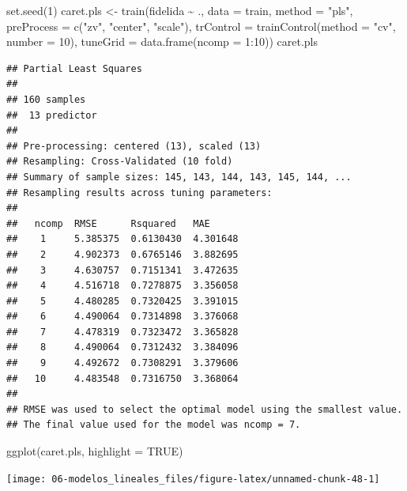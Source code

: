 \documentclass[
  spanish,
]{book}
\newenvironment{Shaded}{\begin{snugshade}}{\end{snugshade}}
\newcommand{\AttributeTok}[1]{\textcolor[rgb]{0.77,0.63,0.00}{#1}}
\newcommand{\ConstantTok}[1]{\textcolor[rgb]{0.00,0.00,0.00}{#1}}
\newcommand{\DecValTok}[1]{\textcolor[rgb]{0.00,0.00,0.81}{#1}}
\newcommand{\FunctionTok}[1]{\textcolor[rgb]{0.00,0.00,0.00}{#1}}
\newcommand{\NormalTok}[1]{#1}
\newcommand{\OtherTok}[1]{\textcolor[rgb]{0.56,0.35,0.01}{#1}}
\newcommand{\SpecialCharTok}[1]{\textcolor[rgb]{0.00,0.00,0.00}{#1}}
\newcommand{\StringTok}[1]{\textcolor[rgb]{0.31,0.60,0.02}{#1}}
\theoremstyle{break}
\theoremstyle{definition}
\theoremstyle{definition}
\theoremstyle{definition}
\theoremstyle{definition}
\theoremstyle{remark}
\begin{document}
\begin{Shaded}
\begin{Highlighting}[]
\FunctionTok{set.seed}\NormalTok{(}\DecValTok{1}\NormalTok{)}
\NormalTok{caret.pls }\OtherTok{\textless{}{-}} \FunctionTok{train}\NormalTok{(fidelida }\SpecialCharTok{\textasciitilde{}}\NormalTok{ ., }\AttributeTok{data =}\NormalTok{ train, }\AttributeTok{method =} \StringTok{"pls"}\NormalTok{,}
                   \AttributeTok{preProcess =} \FunctionTok{c}\NormalTok{(}\StringTok{"zv"}\NormalTok{, }\StringTok{"center"}\NormalTok{, }\StringTok{"scale"}\NormalTok{),}
                   \AttributeTok{trControl =} \FunctionTok{trainControl}\NormalTok{(}\AttributeTok{method =} \StringTok{"cv"}\NormalTok{, }\AttributeTok{number =} \DecValTok{10}\NormalTok{),}
                   \AttributeTok{tuneGrid =} \FunctionTok{data.frame}\NormalTok{(}\AttributeTok{ncomp =} \DecValTok{1}\SpecialCharTok{:}\DecValTok{10}\NormalTok{))}
\NormalTok{caret.pls}
\end{Highlighting}
\end{Shaded}

\begin{verbatim}
## Partial Least Squares 
## 
## 160 samples
##  13 predictor
## 
## Pre-processing: centered (13), scaled (13) 
## Resampling: Cross-Validated (10 fold) 
## Summary of sample sizes: 145, 143, 144, 143, 145, 144, ... 
## Resampling results across tuning parameters:
## 
##   ncomp  RMSE      Rsquared   MAE     
##    1     5.385375  0.6130430  4.301648
##    2     4.902373  0.6765146  3.882695
##    3     4.630757  0.7151341  3.472635
##    4     4.516718  0.7278875  3.356058
##    5     4.480285  0.7320425  3.391015
##    6     4.490064  0.7314898  3.376068
##    7     4.478319  0.7323472  3.365828
##    8     4.490064  0.7312432  3.384096
##    9     4.492672  0.7308291  3.379606
##   10     4.483548  0.7316750  3.368064
## 
## RMSE was used to select the optimal model using the smallest value.
## The final value used for the model was ncomp = 7.
\end{verbatim}

\begin{Shaded}
\begin{Highlighting}[]
\FunctionTok{ggplot}\NormalTok{(caret.pls, }\AttributeTok{highlight =} \ConstantTok{TRUE}\NormalTok{)}
\end{Highlighting}
\end{Shaded}

\begin{center}\texttt{[image: 06-modelos\_lineales\_files/figure-latex/unnamed-chunk-48-1]} \end{center}
\end{document}
